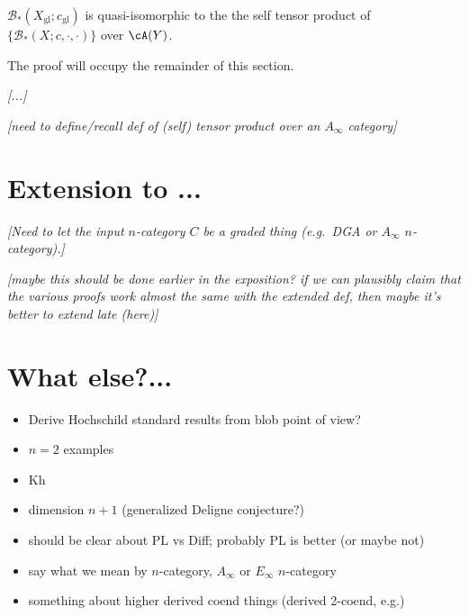 \documentclass[11pt,leqno]{amsart}
\def\bc{{\mathcal B}}
\def\sgl{_\mathrm{gl}}
\def\nn#1{{{\it \small [#1]}}}
\begin{document}
\begin{thm}
$\bc_*(X\sgl; c\sgl)$ is quasi-isomorphic to the the self tensor product
of $\{\bc_*(X; c, \cdot, \cdot)\}$ over $\cA(Y)$.
\end{thm}

The proof will occupy the remainder of this section.

\nn{...}

\bigskip

\nn{need to define/recall def of (self) tensor product over an $A_\infty$ category}





\section{Extension to ...}

\nn{Need to let the input $n$-category $C$ be a graded thing
(e.g.~DGA or $A_\infty$ $n$-category).}

\nn{maybe this should be done earlier in the exposition?
if we can plausibly claim that the various proofs work almost
the same with the extended def, then maybe it's better to extend late (here)}


\section{What else?...}

\begin{itemize}
\item Derive Hochschild standard results from blob point of view?
\item $n=2$ examples
\item Kh
\item dimension $n+1$ (generalized Deligne conjecture?)
\item should be clear about PL vs Diff; probably PL is better
(or maybe not)
\item say what we mean by $n$-category, $A_\infty$ or $E_\infty$ $n$-category
\item something about higher derived coend things (derived 2-coend, e.g.)
\end{itemize}
\end{document}
